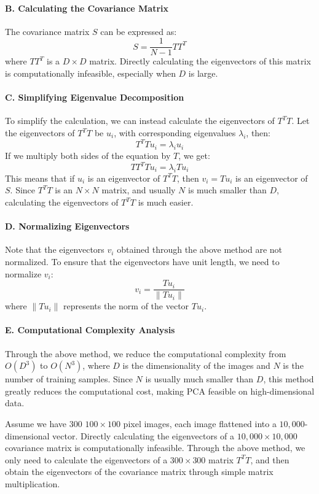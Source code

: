 \documentclass{article}
\begin{document}
\paragraph{B. Calculating the Covariance Matrix}
The covariance matrix \( S \) can be expressed as:
\[
S = \frac{1}{N - 1} T T^T
\]
where \( T T^T \) is a \( D \times D \) matrix. Directly calculating the eigenvectors of this matrix is computationally infeasible, especially when \( D \) is large.

\paragraph{C. Simplifying Eigenvalue Decomposition}
To simplify the calculation, we can instead calculate the eigenvectors of \( T^T T \). Let the eigenvectors of \( T^T T \) be \( u_i \), with corresponding eigenvalues \( \lambda_i \), then:
\[
T^T T u_i = \lambda_i u_i
\]
If we multiply both sides of the equation by \( T \), we get:
\[
T T^T T u_i = \lambda_i T u_i
\]
This means that if \( u_i \) is an eigenvector of \( T^T T \), then \( v_i = T u_i \) is an eigenvector of \( S \). Since \( T^T T \) is an \( N \times N \) matrix, and usually \( N \) is much smaller than \( D \), calculating the eigenvectors of \( T^T T \) is much easier.

\paragraph{D. Normalizing Eigenvectors}
Note that the eigenvectors \( v_i \) obtained through the above method are not normalized. To ensure that the eigenvectors have unit length, we need to normalize \( v_i \):
\[
v_i = \frac{T u_i}{\|T u_i\|}
\]
where \( \|T u_i\| \) represents the norm of the vector \( T u_i \).

\paragraph{E. Computational Complexity Analysis}
Through the above method, we reduce the computational complexity from \( O(D^3) \) to \( O(N^3) \), where \( D \) is the dimensionality of the images and \( N \) is the number of training samples. Since \( N \) is usually much smaller than \( D \), this method greatly reduces the computational cost, making PCA feasible on high-dimensional data.

Assume we have 300 \( 100 \times 100 \) pixel images, each image flattened into a \( 10,000 \)-dimensional vector. Directly calculating the eigenvectors of a \( 10,000 \times 10,000 \) covariance matrix is computationally infeasible. Through the above method, we only need to calculate the eigenvectors of a \( 300 \times 300 \) matrix \( T^T T \), and then obtain the eigenvectors of the covariance matrix through simple matrix multiplication.
\end{document}
